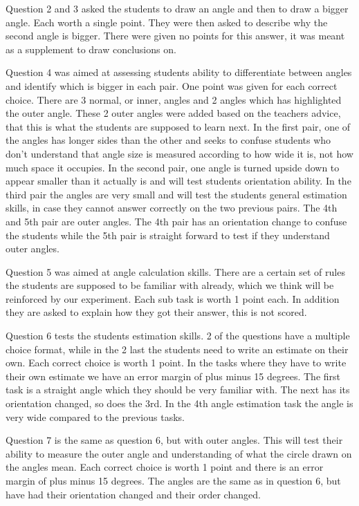 \bigskip\noindent
Question 2 and 3 asked the students to draw an angle and then to draw a bigger angle. Each worth a single point. They were then asked to describe why the second angle is bigger. There were given no points 
for this answer, it was meant as a supplement to draw conclusions on.

\bigskip\noindent
Question 4 was aimed at assessing students ability to differentiate between angles and identify which is bigger in each pair. One point was given for each correct choice. There are 3 normal, or inner, angles and 2 angles which has highlighted the outer angle. These 2 outer angles were added based on the teachers advice, that this is what the students are supposed to learn next. In the first pair, one of the angles has longer sides than the other and seeks to confuse students who don't understand that angle size is measured according to how wide it is, not how much space it occupies. In the second pair, one angle is turned upside down to appear smaller than it actually is and will test students orientation ability. In the third pair the angles are very small and will test the students general estimation skills, in case they cannot answer correctly on the two previous pairs. The 4th and 5th pair are outer angles. The 4th pair has an orientation change to confuse the students while the 5th pair is straight forward to test if they understand outer angles. 

\bigskip\noindent
Question 5 was aimed at angle calculation skills. There are a certain set of rules the students are supposed to be familiar with already, which we think will be reinforced by our experiment. Each sub task is worth 1 point each. In addition they are asked to explain how they got their answer, this is not scored.

\bigskip\noindent
Question 6 tests the students estimation skills. 2 of the questions have a multiple choice format, while in the 2 last the students need to write an estimate on their own. Each correct choice is worth 1 point. In the tasks where they have to write their own estimate we have an error margin of plus minus 15 degrees. The first task is a straight angle which they should be very familiar with. The next has its orientation changed, so does the 3rd. In the 4th angle estimation task the angle is very wide compared to the previous tasks. 

\bigskip\noindent
Question 7 is the same as question 6, but with outer angles. This will test their ability to measure the outer angle and understanding of what the circle drawn on the angles mean. Each correct choice is worth 1 point and there is an error margin of plus minus 15 degrees. The angles are the same as in question 6, but have had their orientation changed and their order changed. 

